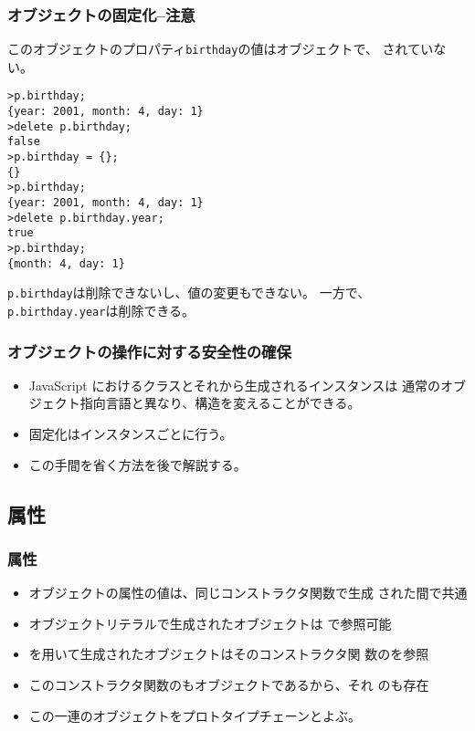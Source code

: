 \begin{frame}[containsverbatim]
\begin{frame}[containsverbatim]
 \frametitle{オブジェクトの固定化--注意}
 このオブジェクトのプロパティ\texttt{birthday}の値はオブジェクトで、
 されていない。
 {\scriptsize
\begin{Verbatim}
>p.birthday;
{year: 2001, month: 4, day: 1}
>delete p.birthday;
false
>p.birthday = {};
{}
>p.birthday;
{year: 2001, month: 4, day: 1}
>delete p.birthday.year;
true
>p.birthday;
{month: 4, day: 1}
\end{Verbatim}
 }
 \texttt{p.birthday}は削除できないし、値の変更もできない。
 一方で、\texttt{p.birthday.year}は削除できる。
\end{frame}
\begin{frame}[containsverbatim]
 \frametitle{オブジェクトの操作に対する安全性の確保}
 \begin{itemize}
  \item JavaScript におけるクラスとそれから生成されるインスタンスは
 通常のオブジェクト指向言語と異なり、構造を変えることができる。
  \item  固定化はインスタンスごとに行う。
  \item この手間を省く方法を後で解説する。
 \end{itemize}
\end{frame}
 \subsection{\protect{}属性}
 \begin{frame}[containsverbatim]
  \frametitle{\protect{}属性}
  \begin{itemize}
   \item オブジェクトの属性の値は、同じコンストラクタ関数で生成
 された間で共通
   \item オブジェクトリテラルで生成されたオブジェクトは
         で参照可能
   \item {}を用いて生成されたオブジェクトはそのコンストラクタ関
         数のを参照
   \item このコンストラクタ関数のもオブジェクトであるから、それ
 のも存在
   \item この一連のオブジェクトをプロトタイプチェーンとよぶ。
  \end{itemize}
 \end{frame}

\end{frame}
